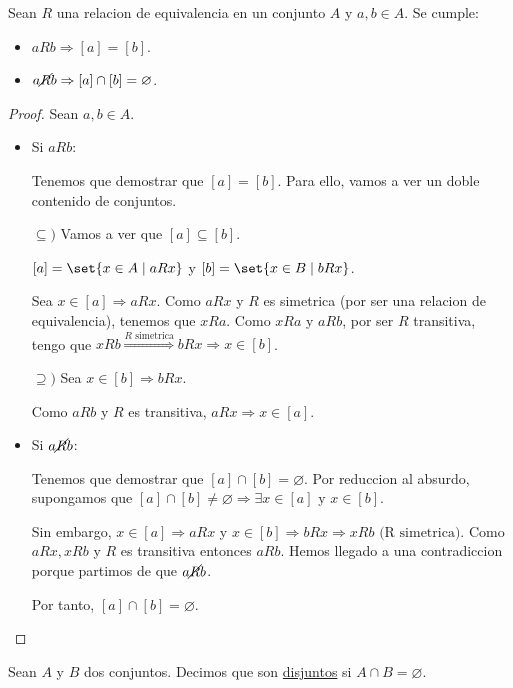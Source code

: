 \begin{proposition}
	Sean \(R \) una relacion de equivalencia en un conjunto \(A \) y \(a,b \in  A \). Se cumple:
	\begin{itemize}
		\item \(aRb \Rightarrow [a] = [b ]\).
		\item \(a\cancel R b \Rightarrow [a] \cap [b] = \varnothing\).
	\end{itemize}
\end{proposition}
\begin{proof}
	Sean \(a,b \in A \).
	\begin{itemize}
		\item Si \(aRb \):

		      Tenemos que demostrar que \([a] = [b ]\). Para ello, vamos a ver un doble contenido de conjuntos.

		      \(\subseteq ) \) Vamos a ver que \([a] \subseteq [b ]\).

		      \([a] = \set{x  \in A \mid aRx}\) y \([b] = \set{x \in B \mid bRx }\).

		      Sea \(x \in [a ] \Rightarrow aRx\). Como \(aRx \) y \(R \) es simetrica (por ser una relacion de equivalencia), tenemos que \(xRa \). Como \(xRa \) y \(aRb \), por ser \(R \) transitiva, tengo que \(xRb \overset{R \text{ simetrica}}{\Rightarrow} bRx \Rightarrow x \in [b]\).

		      \(\supseteq ) \) Sea \(x \in [b ] \Rightarrow bRx\).

		      Como \(aRb \) y \(R \) es transitiva, \(aRx \Rightarrow x \in [a]\).

		\item Si \(a \cancel R b \):

		      Tenemos que demostrar que \([a] \cap [b] = \varnothing\). Por reduccion al absurdo, supongamos que \([a] \cap [b ] \neq \varnothing \Rightarrow \exists x \in [a] \text{ y } x \in  [b]\).

		      Sin embargo, \(x \in [a ] \Rightarrow aRx \) y \(x \in [b ] \Rightarrow bRx \Rightarrow xRb \text{ (R simetrica)} \). Como \(aRx, xRb\) y \(R \) es transitiva entonces \(aRb \). Hemos llegado a una contradiccion porque partimos de que \(a\cancel R b \).

		      Por tanto, \([a] \cap [b] = \varnothing \).
	\end{itemize}
\end{proof}

\begin{definition}
	Sean \(A \) y \(B \) dos conjuntos. Decimos que son \underline{disjuntos} si \(A \cap B = \varnothing \).
\end{definition}

